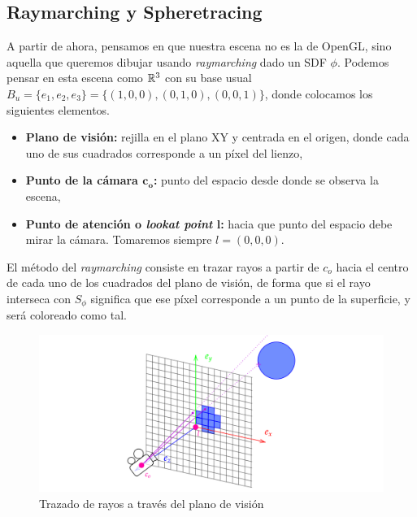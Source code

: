 \subsection{Raymarching y Spheretracing}
A partir de ahora, pensamos en que nuestra escena no es la de OpenGL, sino aquella que queremos dibujar usando \textit{raymarching} dado un SDF $\phi$. Podemos pensar en esta escena como $\mathbb{R}^3$ con su base usual $B_u = \{e_1,e_2,e_3\} = \{(1,0,0),(0,1,0),(0,0,1)\}$, donde colocamos los siguientes elementos.
\begin{itemize}
    \item \textbf{Plano de visión:} rejilla en el plano XY y centrada en el origen, donde cada uno de sus cuadrados corresponde a un píxel del lienzo,
    \item \textbf{Punto de la cámara $\boldsymbol{c_o}$:} punto del espacio desde donde se observa la escena,
    \item \textbf{Punto de atención o \textit{lookat point} $\boldsymbol{l}$:} hacia que punto del espacio debe mirar la cámara. Tomaremos siempre $l=(0,0,0)$.
\end{itemize}

El método del \textit{raymarching} consiste en trazar rayos a partir de $c_o$ hacia el centro de cada uno de los cuadrados del plano de visión, de forma que si el rayo interseca con $S_\phi$ significa que ese píxel corresponde a un punto de la superficie, y será coloreado como tal.
\begin{figure}[h]
    \centering
    \includegraphics[width=\textwidth]{Plantilla-TFG-master/img/raymarch.png}
    \caption{Trazado de rayos a través del plano de visión}
    \label{fig:raymarch1}
\end{figure}
\newline

